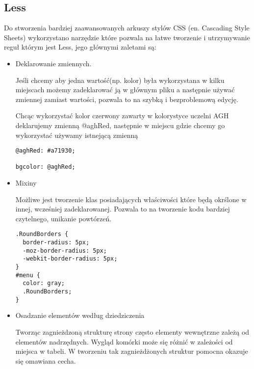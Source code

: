 \subsection{Less}
\label{sec:less}

Do stworzenia bardziej zaawansowanych arkuszy stylów CSS (en. Cascading Style Sheets) wykorzystano narzędzie które pozwala na łatwe tworzenie i utrzymywanie reguł którym jest Less, jego głównymi zaletami są:

\begin{itemize}
\item
Deklarowanie zmiennych.

Jeśli chcemy aby jedna wartość(np. kolor) była wykorzystana w kilku miejscach możemy zadeklarować ją w głównym pliku  a następnie używać zmiennej zamiast wartości, pozwala to na szybką i bezproblemową edycję.

Chcąc wykorzystać kolor czerwony zawarty w kolorystyce uczelni AGH deklarujemy zmienną @aghRed, następnie w miejscu gdzie chcemy go wykorzystać używamy istnejącą zmienną

\lstset{language=JavaScript}
\label{lis:webSql}
\begin{lstlisting}[caption=Deklaracja zmiennych]
@aghRed: #a71930;

bgcolor: @aghRed;
\end{lstlisting}

\item
Mixiny

Możliwe jest tworzenie klas posiadających  właściwości które będą okrślone w innej, wcześniej zadeklarowanej. Pozwala to na tworzenie kodu bardziej czytelnego, unikanie powtórzeń.


\lstset{language=JavaScript}
\label{lis:webSql}
\begin{lstlisting}[caption=Mixin]
.RoundBorders {
  border-radius: 5px;
  -moz-border-radius: 5px;
  -webkit-border-radius: 5px;
}
#menu {
  color: gray;
  .RoundBorders;
}
\end{lstlisting}

\item
Osadzanie elementów według dziedziczenia

Tworząc zagnieżdzoną strukturę strony często elementy wewnętrzne zależą od elementów nadrzędnych. Wygląd komórki może się różnić w zależości od miejsca w tabeli. W tworzeniu tak zagnieżdżonych struktur pomocna okazuje się omawiana cecha.

\end{itemize}
